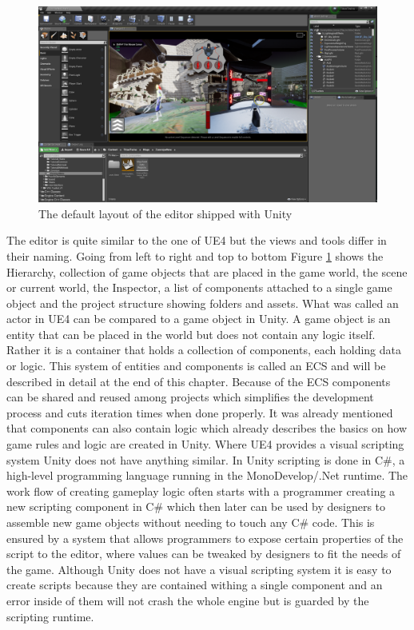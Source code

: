 \begin{figure}[h!]
	\includegraphics[width=\linewidth]{PICs/unreal_ed.png}
	\caption{The default layout of the editor shipped with Unity}
	\label{fig:unity_ed}
\end{figure}

The editor is quite similar to the one of \ac{UE4} but the views and tools differ in their naming. Going from left to right and top to bottom Figure \ref{fig:unity_ed} shows the Hierarchy, collection of game objects that are placed in the game world, the scene or current world, the Inspector, a list of components attached to a single game object and the project structure showing folders and assets. 
What was called an actor in \ac{UE4} can be compared to a game object in Unity. A game object is an entity that can be placed in the world but does not contain any logic itself. Rather it is a container that holds a collection of components, each holding data or logic. This system of entities and components is called an \acl{ECS} and will be described in detail at the end of this chapter. Because of the \ac{ECS} components can be shared and reused among projects which simplifies the development process and cuts iteration times when done properly.
It was already mentioned that components can also contain logic which already describes the basics on how game rules and logic are created in Unity. Where \ac{UE4} provides a visual scripting system Unity does not have anything similar. In Unity scripting is done in C\#, a high-level programming language running in the MonoDevelop/.Net runtime. The work flow of creating gameplay logic often starts with a programmer creating a new scripting component in C\# which then later can be used by designers to assemble new game objects without needing to touch any C\# code. This is ensured by a system that allows programmers to expose certain properties of the script to the editor, where values can be tweaked by designers to fit the needs of the game. Although Unity does not have a visual scripting system it is easy to create scripts because they are contained withing a single component and an error inside of them will not crash the whole engine but is guarded by the scripting runtime.

